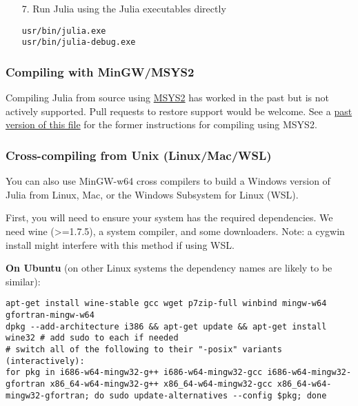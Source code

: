 \begin{itemize}
\item[7. ] Run Julia using the Julia executables directly


\begin{lstlisting}
usr/bin/julia.exe
usr/bin/julia-debug.exe
\end{lstlisting}

\end{itemize}


\hypertarget{5433981816410773170}{}


\subsubsection{Compiling with MinGW/MSYS2}



Compiling Julia from source using \href{https://msys2.github.io}{MSYS2} has worked in the past but is not actively supported. Pull requests to restore support would be welcome. See a \href{https://github.com/JuliaLang/julia/blob/v0.6.0/README.windows.md}{past version of this file} for the former instructions for compiling using MSYS2.



\hypertarget{16470279549755078624}{}


\subsubsection{Cross-compiling from Unix (Linux/Mac/WSL)}



You can also use MinGW-w64 cross compilers to build a Windows version of Julia from Linux, Mac, or the Windows Subsystem for Linux (WSL).



First, you will need to ensure your system has the required dependencies. We need wine (>=1.7.5), a system compiler, and some downloaders. Note: a cygwin install might interfere with this method if using WSL.



\textbf{On Ubuntu} (on other Linux systems the dependency names are likely to be similar):




\begin{lstlisting}
apt-get install wine-stable gcc wget p7zip-full winbind mingw-w64 gfortran-mingw-w64
dpkg --add-architecture i386 && apt-get update && apt-get install wine32 # add sudo to each if needed
# switch all of the following to their "-posix" variants (interactively):
for pkg in i686-w64-mingw32-g++ i686-w64-mingw32-gcc i686-w64-mingw32-gfortran x86_64-w64-mingw32-g++ x86_64-w64-mingw32-gcc x86_64-w64-mingw32-gfortran; do sudo update-alternatives --config $pkg; done
\end{lstlisting}



